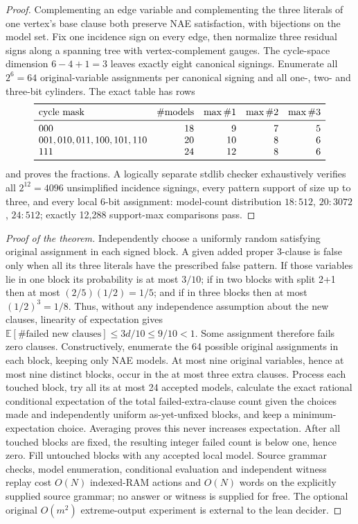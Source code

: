 \documentclass[10pt]{article}
\begin{document}
\begin{proof}
Complementing an edge variable and complementing the three literals of one vertex's base clause both preserve NAE satisfaction, with bijections on the model set. Fix one incidence sign on every edge, then normalize three residual signs along a spanning tree with vertex-complement gauges. The cycle-space dimension $6-4+1=3$ leaves exactly eight canonical signings. Enumerate all $2^6=64$ original-variable assignments per canonical signing and all one-, two- and three-bit cylinders. The exact table has rows
\[
\begin{array}{lrrrr}\toprule
\text{cycle mask}&\#\text{models}&\max\#1&\max\#2&\max\#3\\\midrule
000&18&9&7&5\\
001,010,011,100,101,110&20&10&8&6\\
111&24&12&8&6\\\bottomrule
\end{array}
\]
and proves the fractions. A logically separate stdlib checker exhaustively verifies all $2^{12}=4096$ unsimplified incidence signings, every pattern support of size up to three, and every local 6-bit assignment: model-count distribution $18:512$, $20:3072$, $24:512$; exactly 12,288 support-max comparisons pass.
\end{proof}
\begin{proof}[Proof of the theorem]
Independently choose a uniformly random satisfying original assignment in each signed block. A given added proper 3-clause is false only when all its three literals have the prescribed false pattern. If those variables lie in one block its probability is at most $3/10$; if in two blocks with split 2+1 then at most $(2/5)(1/2)=1/5$; and if in three blocks then at most $(1/2)^3=1/8$. Thus, without any independence assumption about the new clauses, linearity of expectation gives $\mathbb E[\#\text{failed new clauses}]\le3d/10\le9/10<1$. Some assignment therefore fails zero clauses.
Constructively, enumerate the 64 possible original assignments in each block, keeping only NAE models. At most nine original variables, hence at most nine distinct blocks, occur in the at most three extra clauses. Process each touched block, try all its at most 24 accepted models, calculate the exact rational conditional expectation of the total failed-extra-clause count given the choices made and independently uniform as-yet-unfixed blocks, and keep a minimum-expectation choice. Averaging proves this never increases expectation. After all touched blocks are fixed, the resulting integer failed count is below one, hence zero. Fill untouched blocks with any accepted local model. Source grammar checks, model enumeration, conditional evaluation and independent witness replay cost $O(N)$ indexed-RAM actions and $O(N)$ words on the explicitly supplied source grammar; no answer or witness is supplied for free. The optional original $O(m^2)$ extreme-output experiment is external to the lean decider.
\end{proof}
\end{document}
